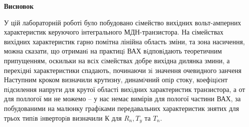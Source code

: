 \documentclass[a4paper,14pt]{extreport}
\begin{document}


\begin{center}
 \textbf{Висновок}
\end{center}

У цій лабораторній роботі було побудовано сімейство вихідних вольт-амперних характеристик керуючого інтегрального МДН-транзистора.  На сімействах вихідних характеристик 
гарно помітна лінійна область зміни, та зона насичення, можна сказати, що отриманi на практицi ВАХ
вiдповiдають теоретичним припущенням, оскильки на всiх сiмействах добре вихідна дилянка змини, а перехiдні характеристики спадають,
починаючи зi значення очевидного занченя
Наступним кроком визначили крутизну, динамiчний опiр стоку, коефiцiєнт пiдсилення напруги для крутої області вихiдних характеристик транзистора, а от для поллогої ми не можемо -- у нас немає вимірів для пологої частини ВАХ, за побудованими на малюнку графiками передавальних характеристик знятих для трьох типiв iнверторiв визначили К для $R_{n}, T_{y} $ та  $ T_{n}$.
\end{document}
